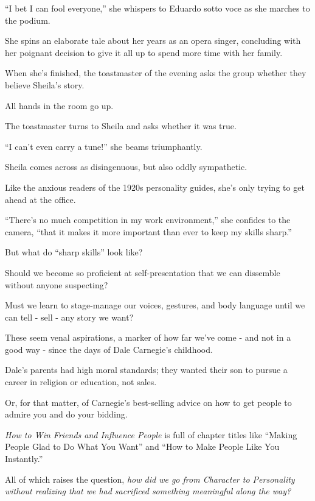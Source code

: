 \documentclass[oneside]{article}
\numberwithin{equation}{section}
\begin{document}
%
``I bet I can fool everyone,'' she whispers to Eduardo sotto voce as she marches to the podium.

She spins an elaborate tale about her years as an opera singer, concluding with her poignant decision to give it all up to spend more time with her family.

When she's finished, the toastmaster of the evening asks the group whether they believe Sheila's story.

All hands in the room go up.

The toastmaster turns to Sheila and asks whether it was true.

%
``I can't even carry a tune!'' she beams triumphantly.

%
Sheila comes across as disingenuous, but also oddly sympathetic.

Like the anxious readers of the 1920s personality guides, she's only trying to get ahead at the office.

``There's no much competition in my work environment,'' she confides to the camera, ``that it makes it more important than ever to keep my skills sharp.''

%
But what do ``sharp skills'' look like?

Should we become so proficient at self-presentation that we can dissemble without anyone suspecting?

Must we learn to stage-manage our voices, gestures, and body language until we can tell - sell - any story we want?

These seem venal aspirations, a marker of how far we've come - and not in a good way - since the days of Dale Carnegie's childhood.

%
Dale's parents had high moral standards; they wanted their son to pursue a career in religion or education, not sales.


Or, for that matter, of Carnegie's best-selling advice on how to get people to admire you and do your bidding.

\textit{How to Win Friends and Influence People} is full of chapter titles like ``Making People Glad to Do What You Want'' and ``How to Make People Like You Instantly.''

%
All of which raises the question, \textit{how did we go from Character to Personality without realizing that we had sacrificed something meaningful along the way?}
\end{document}
